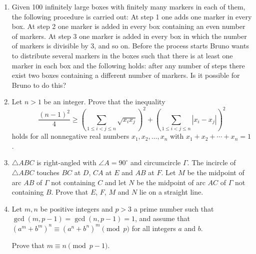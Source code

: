 \documentclass[12pt]{article}
\begin{document}
\begin{enumerate}
\item %
Given 100 infinitely large boxes with finitely many markers in each of them, the following procedure is carried out: At step 1 one adds one marker in every box. At step 2 one marker is added in every box containing an even number of markers. At step 3 one marker is added in every box in which the number of markers is divisible by 3, and so on. Before the process starts Bruno wants to distribute several markers in the boxes such that there is at least one marker in each box and the following holds: after any number of steps there exist two boxes containing a different number of markers. Is it possible for Bruno to do this?


\item %
Let $n > 1$ be an integer. Prove that the inequality
\[ \frac{(n-1)^2}{4} \geq \left(\sum_{1 \leq i < j \leq n} \sqrt{x_i x_j}\right)^2 + \left(\sum_{1 \leq i < j \leq n} \left\lvert x_i-x_j \right\rvert \right)^2 \]
holds for all nonnegative real numbers $x_1, x_2, \dotsc, x_n$ with $x_1 +x_2 +\dotsb +x_n = 1$.


\item %
$\triangle ABC$ is right-angled with $\angle A=90^\circ$ and circumcircle $\Gamma$. The incircle of $\triangle ABC$ touches $BC$ at $D$, $CA$ at $E$ and $AB$ at $F$. Let $M$ be the midpoint of arc $AB$ of $\Gamma$ not containing $C$ and let $N$ be the midpoint of arc $AC$ of $\Gamma$ not containing $B$. Prove that $E$, $F$, $M$ and $N$ lie on a straight line.


\item %
Let $m,n$ be positive integers and $p > 3$ a prime number such that $\gcd(m,p-1) = \gcd(n,p-1) = 1$, and assume that $(a^m + b^m)^n \equiv (a^n + b^n)^m \pmod{p}$ for all integers $a$ and $b$.

Prove that $m \equiv n \pmod{p-1}$.


\end{enumerate}
\end{document}
